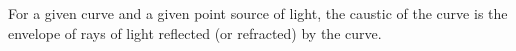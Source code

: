  For a given curve and a given point source of light, the
caustic of the curve is the envelope of rays of light reflected
(or refracted) by the curve.
